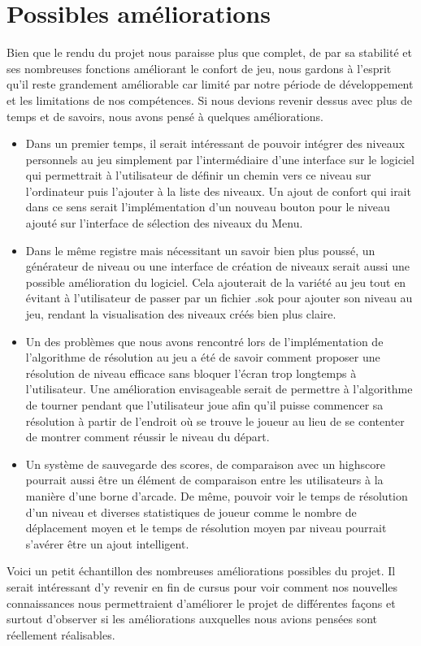 \documentclass[a4paper,12pt]{article} %
\begin{document}
\section{Possibles améliorations} 
Bien que le rendu du projet nous paraisse plus que complet, de par sa stabilité et ses nombreuses fonctions améliorant le confort de jeu, nous gardons à l'esprit qu'il reste  grandement améliorable car limité par notre période de développement et les limitations de nos compétences. Si nous devions revenir dessus avec plus de temps et de savoirs, nous avons pensé à quelques améliorations.
\begin{itemize}
\item Dans un premier temps, il serait intéressant de pouvoir intégrer des niveaux personnels au jeu simplement par l'intermédiaire d'une interface sur le logiciel qui permettrait à l'utilisateur de définir un chemin vers ce niveau sur l'ordinateur puis l'ajouter à la liste des niveaux. Un ajout de confort qui irait dans ce sens serait l'implémentation d'un nouveau bouton pour le niveau ajouté sur l'interface de sélection des niveaux du Menu.
\item Dans le même registre mais nécessitant un savoir bien plus poussé, un générateur de niveau ou une interface de création de niveaux serait aussi une possible amélioration du logiciel. Cela ajouterait de la variété au jeu tout en évitant à l'utilisateur de passer par un fichier .sok pour ajouter son niveau au jeu, rendant la visualisation des niveaux créés bien plus claire.
\item Un des problèmes que nous avons rencontré lors de l'implémentation de l'algorithme de résolution au jeu a été de savoir comment proposer une résolution de niveau efficace sans bloquer l'écran trop longtemps à l'utilisateur. Une amélioration envisageable serait de permettre à l'algorithme de tourner pendant que l'utilisateur joue afin qu'il puisse commencer sa résolution à partir de l'endroit où se trouve le joueur au lieu de se contenter de montrer comment réussir le niveau du départ.
\item Un système de sauvegarde des scores, de comparaison avec un highscore pourrait aussi être un élément de comparaison entre les utilisateurs à la manière d'une borne d'arcade. De même, pouvoir voir le temps de résolution d'un niveau et diverses statistiques de joueur comme le nombre de déplacement moyen et le temps de résolution moyen par niveau pourrait s'avérer être un ajout intelligent. 
\end{itemize}
Voici un petit échantillon des nombreuses améliorations possibles du projet. Il serait intéressant d'y revenir en fin de cursus pour voir comment nos nouvelles connaissances nous permettraient d'améliorer le projet de différentes façons et surtout d'observer si les améliorations auxquelles nous avions pensées sont réellement réalisables.
\end{document}
